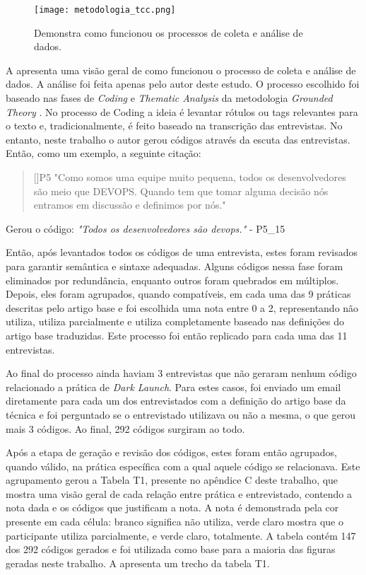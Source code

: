 \begin{figure}[ht]
\begin{center}
\texttt{[image: metodologia\_tcc.png]}
\end{center}
\caption[Fluxograma da Metodologia]{
    Demonstra como funcionou os processos de coleta e análise de dados.
}\label{fluxograma_metodologia}
\end{figure}

    
A  apresenta uma visão geral de como funcionou o processo de coleta e análise de dados. A análise foi feita apenas pelo autor deste estudo. O processo escolhido foi baseado nas fases de \emph{Coding} e \emph{Thematic Analysis} da metodologia \emph{Grounded Theory} \cite{groundedTheory}. No processo de Coding a ideia é levantar rótulos ou tags relevantes para o texto e, tradicionalmente, é feito baseado na transcrição das entrevistas. No entanto, neste trabalho o autor gerou códigos através da escuta das entrevistas. Então, como um exemplo, a seguinte citação:

\begin{quotation}[]{P5}
"Como somos uma equipe muito pequena, todos os desenvolvedores são meio que DEVOPS. Quando tem que tomar alguma decisão nós entramos em discussão e definimos por nós."
\end{quotation}

Gerou o código: \emph{"Todos os desenvolvedores são devops."} - P5\_15

Então, após levantados todos os códigos de uma entrevista, estes foram revisados para garantir semântica e sintaxe adequadas. Alguns códigos nessa fase foram eliminados por redundância, enquanto outros foram quebrados em múltiplos. Depois, eles foram agrupados, quando compatíveis, em cada uma das 9 práticas descritas pelo artigo base e foi escolhida uma nota entre 0 a 2, representando não utiliza, utiliza parcialmente e utiliza completamente baseado nas definições do artigo base traduzidas. Este processo foi então replicado para cada uma das 11 entrevistas.

Ao final do processo ainda haviam 3 entrevistas que não geraram nenhum código relacionado a prática de \emph{Dark Launch}. Para estes casos, foi enviado um email diretamente para cada um dos entrevistados com a definição do artigo base da técnica e foi perguntado se o entrevistado utilizava ou não a mesma, o que gerou mais 3 códigos. Ao final, 292 códigos surgiram ao todo.

Após a etapa de geração e revisão dos códigos, estes foram então agrupados, quando válido, na prática específica com a qual aquele código se relacionava. Este agrupamento gerou a Tabela T1, presente no apêndice C deste trabalho, que mostra uma visão geral de cada relação entre prática e entrevistado, contendo a nota dada e os códigos que justificam a nota. A nota é demonstrada pela cor presente em cada célula: branco significa não utiliza, verde claro mostra que o participante utiliza parcialmente, e verde claro, totalmente. A tabela contém 147 dos 292 códigos gerados e foi utilizada como base para a maioria das figuras geradas neste trabalho. A  apresenta um trecho da tabela T1.

